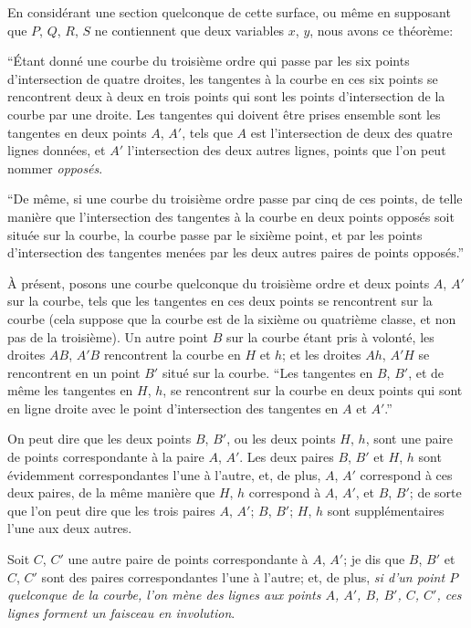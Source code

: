 \documentclass[12pt,a4paper]{article}
\begin{document}
En consid\'erant une section quelconque de cette surface, ou m\^eme en supposant que $P$, $Q$, $R$, $S$ ne contiennent que deux variables $x$, $y$, nous avons ce th\'eor\`eme:

``\'Etant donn\'e une courbe du troisi\`eme ordre qui passe par les six points d'intersection de quatre droites, les tangentes \`a la courbe en ces six points se rencontrent deux \`a deux en trois points qui sont les points d'intersection de la courbe par une droite. Les tangentes qui doivent \^etre prises ensemble sont les tangentes en deux points $A$, $A'$, tels que $A$ est l'intersection de deux des quatre lignes donn\'ees, et $A'$ l'intersection des deux autres lignes, points que l'on peut nommer \textit{oppos\'es}.

``De m\^eme, si une courbe du troisi\`eme ordre passe par cinq de ces points, de telle mani\`ere que l'intersection des tangentes \`a la courbe en deux points oppos\'es soit situ\'ee sur la courbe, la courbe passe par le sixi\`eme point, et par les points d'intersection des tangentes men\'ees par les deux autres paires de points oppos\'es.''

\`A pr\'esent, posons une courbe quelconque du troisi\`eme ordre et deux points $A$, $A'$ sur la courbe, tels que les tangentes en ces deux points se rencontrent sur la courbe (cela suppose que la courbe est de la sixi\`eme ou quatri\`eme classe, et non pas de la troisi\`eme). Un autre point $B$ sur la courbe \'etant pris \`a volont\'e, les droites $AB$, $A'B$ rencontrent la courbe en $H$ et $h$; et les droites $Ah$, $A'H$ se rencontrent en un point $B'$ situ\'e sur la courbe. ``Les tangentes en $B$, $B'$, et de m\^eme les tangentes en $H$, $h$, se rencontrent sur la courbe en deux points qui sont en ligne droite avec le point d'intersection des tangentes en $A$ et $A'$.''

On peut dire que les deux points $B$, $B'$, ou les deux points $H$, $h$, sont une paire de points correspondante \`a la paire $A$, $A'$. Les deux paires $B$, $B'$ et $H$, $h$ sont \'evidemment correspondantes l'une \`a l'autre, et, de plus, $A$, $A'$ correspond \`a ces deux paires, de la m\^eme mani\`ere que $H$, $h$ correspond \`a $A$, $A'$, et $B$, $B'$; de sorte que l'on peut dire que les trois paires $A$, $A'$; $B$, $B'$; $H$, $h$ sont suppl\'ementaires l'une aux deux autres.

Soit $C$, $C'$ une autre paire de points correspondante \`a $A$, $A'$; je dis que $B$, $B'$ et $C$, $C'$ sont des paires correspondantes l'une \`a l'autre; et, de plus, \textit{si d'un point $P$ quelconque de la courbe, l'on m\`ene des lignes aux points $A$, $A'$, $B$, $B'$, $C$, $C'$, ces lignes forment un faisceau en involution}.
\end{document}
